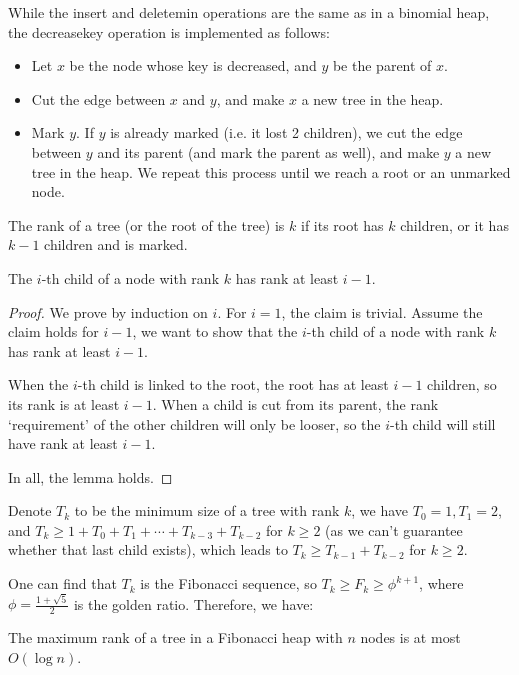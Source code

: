 While the insert and deletemin operations are the same as in a binomial heap, the decreasekey operation is implemented as follows:

\begin{itemize}
	\item Let $x$ be the node whose key is decreased, and $y$ be the parent of $x$.
	\item Cut the edge between $x$ and $y$, and make $x$ a new tree in the heap.
	\item Mark $y$. If $y$ is already marked (i.e. it lost 2 children), we cut the edge between $y$ and its parent (and mark the parent as well), and make $y$ a new tree in the heap. We repeat this process until we reach a root or an unmarked node.
\end{itemize}

\begin{definition}
	The rank of a tree (or the root of the tree) is $k$ if its root has $k$ children, or it has $k-1$ children and is marked.
\end{definition}

\begin{lemma}
	The $i$-th child of a node with rank $k$ has rank at least $i-1$.
\end{lemma}
\begin{proof}
	We prove by induction on $i$. For $i=1$, the claim is trivial. Assume the claim holds for $i-1$, we want to show that the $i$-th child of a node with rank $k$ has rank at least $i-1$.

	When the $i$-th child is linked to the root, the root has at least $i-1$ children, so its rank is at least $i-1$. When a child is cut from its parent, the rank `requirement' of the other children will only be looser, so the $i$-th child will still have rank at least $i-1$.

	In all, the lemma holds.
\end{proof}

Denote $T_k$ to be the minimum size of a tree with rank $k$, we have $T_0 = 1, T_1 = 2$, and $T_k \ge 1 + T_0 + T_1 + \cdots + T_{k-3} + T_{k-2}$ for $k\ge 2$ (as we can't guarantee whether that last child exists), which leads to $T_k \ge T_{k-1} + T_{k-2}$ for $k\ge 2$.

One can find that $T_k$ is the Fibonacci sequence, so $T_k \ge F_k \ge \phi^{k+1}$, where $\phi = \frac{1+\sqrt{5}}{2}$ is the golden ratio. Therefore, we have:

\begin{corollary}
	The maximum rank of a tree in a Fibonacci heap with $n$ nodes is at most $O(\log n)$.
\end{corollary}

